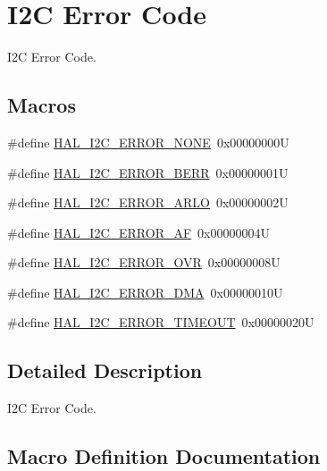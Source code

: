 \hypertarget{group___i2_c___error___code}{}\section{I2C Error Code}
\label{group___i2_c___error___code}


I2C Error Code.  


\subsection*{Macros}
\begin{DoxyCompactItemize}
\item 
\#define \hyperlink{group___i2_c___error___code_ga0b8ca289091d942032c89484b6211d0d}{H\+A\+L\+\_\+\+I2\+C\+\_\+\+E\+R\+R\+O\+R\+\_\+\+N\+O\+NE}~0x00000000U
\item 
\#define \hyperlink{group___i2_c___error___code_gab9f6e39431ee764ada50fd63f0ad2fbf}{H\+A\+L\+\_\+\+I2\+C\+\_\+\+E\+R\+R\+O\+R\+\_\+\+B\+E\+RR}~0x00000001U
\item 
\#define \hyperlink{group___i2_c___error___code_ga048b36222884bfe80ce2d37fa868690b}{H\+A\+L\+\_\+\+I2\+C\+\_\+\+E\+R\+R\+O\+R\+\_\+\+A\+R\+LO}~0x00000002U
\item 
\#define \hyperlink{group___i2_c___error___code_gad1cc236ad6ba5cafe66aecb0dbedc65a}{H\+A\+L\+\_\+\+I2\+C\+\_\+\+E\+R\+R\+O\+R\+\_\+\+AF}~0x00000004U
\item 
\#define \hyperlink{group___i2_c___error___code_ga38d8f9beb4c681eba786f6154d4f594a}{H\+A\+L\+\_\+\+I2\+C\+\_\+\+E\+R\+R\+O\+R\+\_\+\+O\+VR}~0x00000008U
\item 
\#define \hyperlink{group___i2_c___error___code_gae1091e9e82dcfcfef247b214a11c9db3}{H\+A\+L\+\_\+\+I2\+C\+\_\+\+E\+R\+R\+O\+R\+\_\+\+D\+MA}~0x00000010U
\item 
\#define \hyperlink{group___i2_c___error___code_gaeb3bedf36d78ddf3284a68494ab9d089}{H\+A\+L\+\_\+\+I2\+C\+\_\+\+E\+R\+R\+O\+R\+\_\+\+T\+I\+M\+E\+O\+UT}~0x00000020U
\end{DoxyCompactItemize}


\subsection{Detailed Description}
I2C Error Code. 



\subsection{Macro Definition Documentation}
\mbox{\label{group___i2_c___error___code_gad1cc236ad6ba5cafe66aecb0dbedc65a}} 
